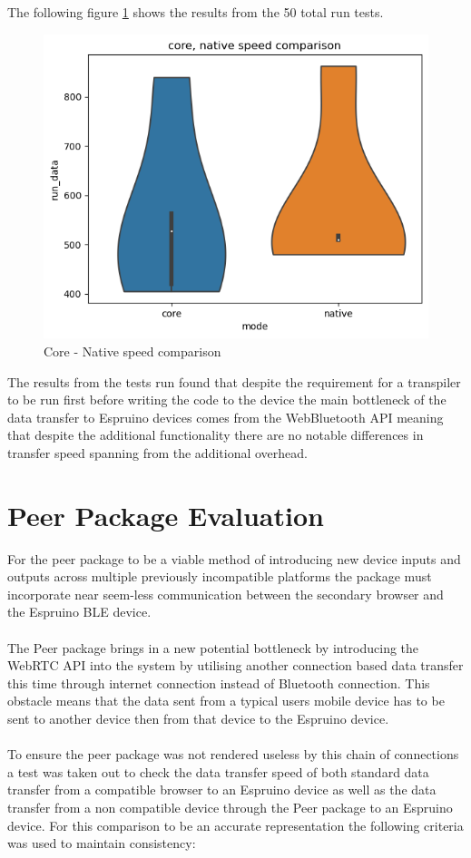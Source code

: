 \documentclass{l4proj}
\begin{document}
The following figure \ref{fig:core_native_speed} shows the results from the 50 total run tests.

\begin{figure}[H]
    \centering
    \includegraphics[width=12cm]{dissertation/images/core-native-speed.png}
    \caption{Core - Native speed comparison}
    \label{fig:core_native_speed}
\end{figure}

The results from the tests run found that despite the requirement for a transpiler to be run first before writing the code to the device the main bottleneck of the data transfer to Espruino devices comes from the WebBluetooth API meaning that despite the additional functionality there are no notable differences in transfer speed spanning from the additional overhead.

\section{Peer Package Evaluation}

For the peer package to be a viable method of introducing new device inputs and outputs across multiple previously incompatible platforms the package must incorporate near seem-less communication between the secondary browser and the Espruino BLE device.
\\ \\
The Peer package brings in a new potential bottleneck by introducing the WebRTC API into the system by utilising another connection based data transfer this time through internet connection instead of Bluetooth connection. This obstacle means that the data sent from a typical users mobile device has to be sent to another device then from that device to the Espruino device.
\\ \\ 
To ensure the peer package was not rendered useless by this chain of connections a test was taken out to check the data transfer speed of both standard data transfer from a compatible browser to an Espruino device as well as the data transfer from a non compatible device through the Peer package to an Espruino device. For this comparison to be an accurate representation the following criteria was used to maintain consistency:
\end{document}
